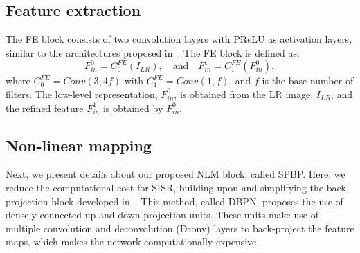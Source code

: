 \documentclass[a4paper,11pt]{article}
\begin{document}
\subsection{Feature extraction}
The FE block consists of two convolution layers with PReLU as activation layers, similar to the architectures proposed in~\cite{DBPN, FSRCNN}. The FE block is defined as:
 \begin{equation}
     {F}_{in}^{0} = {C}_{0}^{FE}(I_{LR}), \quad
     \text{and} \quad
{F}_{in}^{1} = {C}_{1}^{FE}({F}_{in}^{0}),
 \end{equation}
where ${C}_{0}^{FE} = Conv(3, 4f)$ with ${C}_{1}^{FE} = Conv(1, f)$, and $f$ is the base number of filters. The low-level representation, ${F}_{in}^{0}$, is obtained from the LR image, $I_{LR}$, and the refined feature ${F}_{in}^{1}$ is obtained by ${F}_{in}^{0}$.
 
 
\subsection{Non-linear mapping}
Next, we present details about our proposed NLM block, called SPBP. Here, we reduce the computational cost for SISR, building upon and simplifying the back-projection block developed in~\cite{DBPN}. This method, called DBPN, proposes the use of densely connected up and down projection units. These units make use of multiple convolution and deconvolution (Dconv) layers to back-project the feature maps, which makes the network computationally expensive.
\end{document}
